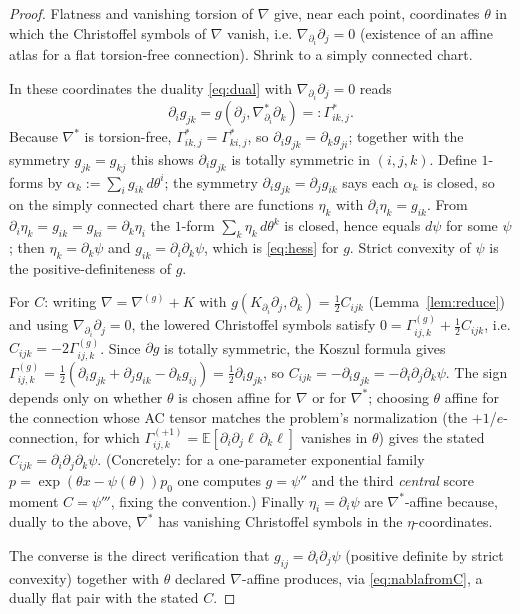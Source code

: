 \documentclass{amsart}
\theoremstyle{definition}
\theoremstyle{remark}
\begin{document}
\begin{proof}
Flatness and vanishing torsion of $\nabla$ give, near each point, coordinates
$\theta$ in which the Christoffel symbols of $\nabla$ vanish, i.e.
$\nabla_{\partial_{i}}\partial_{j}=0$ (existence of an affine atlas for a flat
torsion-free connection). Shrink to a simply connected chart.

In these coordinates the duality \eqref{eq:dual} with $\nabla_{\partial_{i}}
\partial_{j}=0$ reads
\[
  \partial_{i}g_{jk}=g(\partial_{j},\nabla^{*}_{\partial_{i}}\partial_{k})
  =:\Gamma^{*}_{ik,j}.
\]
Because $\nabla^{*}$ is torsion-free, $\Gamma^{*}_{ik,j}=\Gamma^{*}_{ki,j}$, so
$\partial_{i}g_{jk}=\partial_{k}g_{ji}$; together with the symmetry $g_{jk}=g_{kj}$
this shows $\partial_{i}g_{jk}$ is totally symmetric in $(i,j,k)$. Define
$1$-forms by $\alpha_{k}:=\sum_{i}g_{ik}\,d\theta^{i}$; the symmetry
$\partial_{i}g_{jk}=\partial_{j}g_{ik}$ says each $\alpha_{k}$ is closed, so on the
simply connected chart there are functions $\eta_{k}$ with
$\partial_{i}\eta_{k}=g_{ik}$. From $\partial_{i}\eta_{k}=g_{ik}=g_{ki}=
\partial_{k}\eta_{i}$ the $1$-form $\sum_{k}\eta_{k}\,d\theta^{k}$ is closed,
hence equals $d\psi$ for some $\psi$; then $\eta_{k}=\partial_{k}\psi$ and
$g_{ik}=\partial_{i}\partial_{k}\psi$, which is \eqref{eq:hess} for $g$.
Strict convexity of $\psi$ is the positive-definiteness of $g$.

For $C$: writing $\nabla=\nabla^{(g)}+K$ with $g(K_{\partial_{i}}\partial_{j},
\partial_{k})=\tfrac12C_{ijk}$ (Lemma~\ref{lem:reduce}) and using
$\nabla_{\partial_{i}}\partial_{j}=0$, the lowered Christoffel symbols satisfy
$0=\Gamma^{(g)}_{ij,k}+\tfrac12C_{ijk}$, i.e. $C_{ijk}=-2\Gamma^{(g)}_{ij,k}$.
Since $\partial g$ is totally symmetric, the Koszul formula gives
$\Gamma^{(g)}_{ij,k}=\tfrac12(\partial_{i}g_{jk}+\partial_{j}g_{ik}
-\partial_{k}g_{ij})=\tfrac12\partial_{i}g_{jk}$, so
$C_{ijk}=-\partial_{i}g_{jk}=-\partial_{i}\partial_{j}\partial_{k}\psi$. The sign
depends only on whether $\theta$ is chosen affine for $\nabla$ or for
$\nabla^{*}$; choosing $\theta$ affine for the connection whose AC tensor matches
the problem's normalization (the $+1$/$e$-connection, for which
$\Gamma^{(+1)}_{ij,k}=\mathbb E[\partial_{i}\partial_{j}\ell\,\partial_{k}\ell]$
vanishes in $\theta$) gives the stated $C_{ijk}=\partial_{i}\partial_{j}
\partial_{k}\psi$. (Concretely: for a one-parameter exponential family
$p=\exp(\theta x-\psi(\theta))p_{0}$ one computes $g=\psi''$ and the third
\emph{central} score moment $C=\psi'''$, fixing the convention.) Finally
$\eta_{i}=\partial_{i}\psi$ are $\nabla^{*}$-affine because, dually to the above,
$\nabla^{*}$ has vanishing Christoffel symbols in the $\eta$-coordinates.

The converse is the direct verification that $g_{ij}=\partial_{i}\partial_{j}
\psi$ (positive definite by strict convexity) together with $\theta$ declared
$\nabla$-affine produces, via \eqref{eq:nablafromC}, a dually flat pair with the
stated $C$.
\end{proof}
\end{document}
